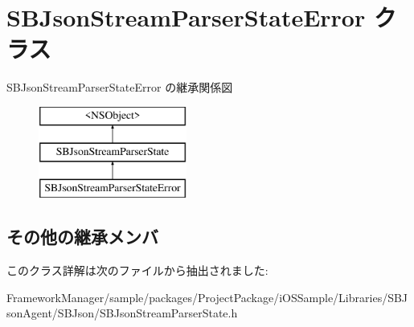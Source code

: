 \hypertarget{interface_s_b_json_stream_parser_state_error}{}\section{S\+B\+Json\+Stream\+Parser\+State\+Error クラス}
\label{interface_s_b_json_stream_parser_state_error}
S\+B\+Json\+Stream\+Parser\+State\+Error の継承関係図\begin{figure}[H]
\begin{center}
\leavevmode
\includegraphics[height=3.000000cm]{interface_s_b_json_stream_parser_state_error}
\end{center}
\end{figure}
\subsection*{その他の継承メンバ}


このクラス詳解は次のファイルから抽出されました\+:\begin{DoxyCompactItemize}
\item 
Framework\+Manager/sample/packages/\+Project\+Package/i\+O\+S\+Sample/\+Libraries/\+S\+B\+Json\+Agent/\+S\+B\+Json/S\+B\+Json\+Stream\+Parser\+State.\+h\end{DoxyCompactItemize}
